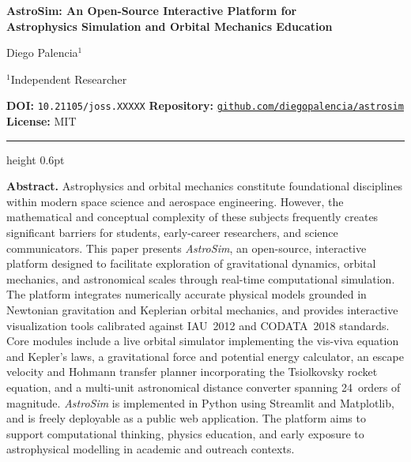 \documentclass[10pt,a4paper]{article}
\begin{document}

\begin{center}
  {\LARGE\bfseries AstroSim: An Open-Source Interactive Platform for\\[4pt]
  Astrophysics Simulation and Orbital Mechanics Education}

  \vspace{1.2em}

  {\large Diego Palencia$^{1}$}

  \vspace{0.5em}

  {\small $^{1}$Independent Researcher}

  \vspace{0.5em}

  {\small
  \textbf{DOI:} \texttt{10.21105/joss.XXXXX}\quad
  \textbf{Repository:} \href{https://github.com/diegopalencia/astrosim}{\texttt{github.com/diegopalencia/astrosim}}\quad
  \textbf{License:} MIT
  }

  \vspace{0.8em}
  \hrule height 0.6pt
\end{center}

\vspace{1em}

\begin{mdframed}[
  backgroundcolor=joss-blue!5,
  linecolor=joss-blue!30,
  linewidth=0.6pt,
  innerleftmargin=14pt,
  innerrightmargin=14pt,
  innertopmargin=10pt,
  innerbottommargin=10pt,
]
\textbf{Abstract.}\quad
Astrophysics and orbital mechanics constitute foundational disciplines within
modern space science and aerospace engineering. However, the mathematical and
conceptual complexity of these subjects frequently creates significant barriers
for students, early-career researchers, and science communicators.
This paper presents \textit{AstroSim}, an open-source, interactive platform
designed to facilitate exploration of gravitational dynamics, orbital mechanics,
and astronomical scales through real-time computational simulation.
The platform integrates numerically accurate physical models grounded in
Newtonian gravitation and Keplerian orbital mechanics, and provides interactive
visualization tools calibrated against IAU~2012 and CODATA~2018 standards.
Core modules include a live orbital simulator implementing the vis-viva equation
and Kepler's laws, a gravitational force and potential energy calculator, an
escape velocity and Hohmann transfer planner incorporating the Tsiolkovsky
rocket equation, and a multi-unit astronomical distance converter spanning
24~orders of magnitude.
\textit{AstroSim} is implemented in Python using Streamlit and Matplotlib, and
is freely deployable as a public web application.
The platform aims to support computational thinking, physics education, and
early exposure to astrophysical modelling in academic and outreach contexts.
\end{mdframed}
\end{document}
